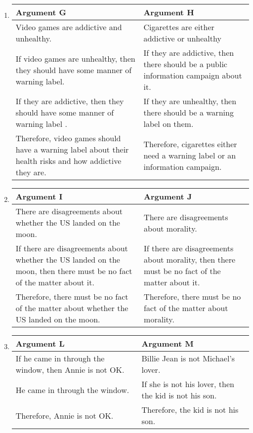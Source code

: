 \begin{enumerate}
\item

\begin{tabular}{p{4.8cm}|p{4.8cm}}
	Argument G&Argument H\\\hline
	Video games are addictive and unhealthy. & Cigarettes are either addictive or unhealthy\\
	If video games are unhealthy, then they should have some manner of warning label. & If they are addictive, then there should be a public information campaign about it.\\
	If they are addictive, then they should have some manner of warning label . & If they are unhealthy, then there should be a warning label on them.\\
	Therefore, video games should have a warning label about their health risks and how addictive they are.& Therefore, cigarettes either need a warning label or an information campaign.\\
	\end{tabular} 

\item

\begin{tabular}{p{4.8cm}|p{4.8cm}}
	Argument I&Argument J\\\hline
	There are disagreements about whether the US landed on the moon. & There are disagreements about morality.\\
	If there are disagreements about whether the US landed on the moon, then there must be no fact of the matter about it. &If there are disagreements about morality, then there must be no fact of the matter about it.\\
	Therefore, there must be no fact of the matter about whether the US landed on the moon. & Therefore, there must be no fact of the matter about morality.\\
	\end{tabular} 

\item

\begin{tabular}{p{4.8cm}|p{4.8cm}}
	Argument L&Argument M\\\hline
	If he came in through the window, then Annie is not OK. & Billie Jean is not Michael's lover.\\
	He came in through the window. &If she is not his lover, then the kid is not his son.\\
	Therefore, Annie is not OK. & Therefore, the kid is not his son.\\
	\end{tabular} 
\end{enumerate}

